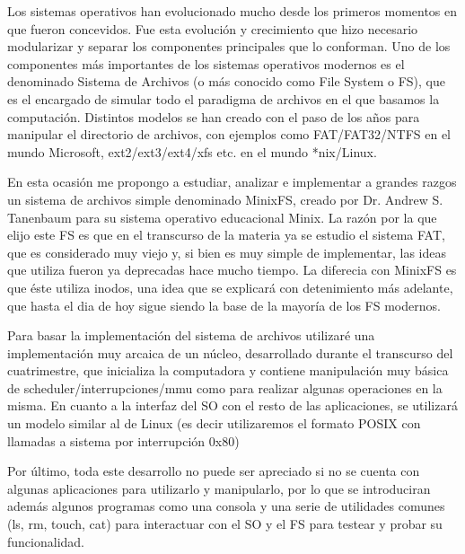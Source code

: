 Los sistemas operativos han evolucionado mucho desde los primeros momentos en
que fueron concevidos. Fue esta evolución y crecimiento que hizo necesario
modularizar y separar los componentes principales que lo conforman. Uno de los
componentes más importantes de los sistemas operativos modernos es el denominado
Sistema de Archivos (o más conocido como File System o FS), que es el encargado
de simular todo el paradigma de archivos en el que basamos la computación.
Distintos modelos se han creado con el paso de los años para manipular el
directorio de archivos, con ejemplos como FAT/FAT32/NTFS en el mundo Microsoft,
ext2/ext3/ext4/xfs etc. en el mundo *nix/Linux.

En esta ocasión me propongo a estudiar, analizar e implementar a grandes razgos
un sistema de archivos simple denominado MinixFS, creado por Dr. Andrew S.
Tanenbaum para su sistema operativo educacional Minix. La razón por la que elijo
este FS es que en el transcurso de la materia ya se estudio el sistema FAT, que
es considerado muy viejo y, si bien es muy simple de implementar, las ideas que
utiliza fueron ya deprecadas hace mucho tiempo. La diferecia con MinixFS es que
éste utiliza inodos, una idea que se explicará con detenimiento más adelante,
que hasta el dia de hoy sigue siendo la base de la mayoría de los FS modernos.

Para basar la implementación del sistema de archivos utilizaré una
implementación muy arcaica de un núcleo, desarrollado durante el transcurso del
cuatrimestre, que inicializa la computadora y contiene manipulación muy básica
de scheduler/interrupciones/mmu como para realizar algunas operaciones en la
misma. En cuanto a la interfaz del SO con el resto de las aplicaciones, se
utilizará un modelo similar al de Linux (es decir utilizaremos el formato POSIX
con llamadas a sistema por interrupción 0x80)

Por último, toda este desarrollo no puede ser apreciado si no se cuenta con
algunas aplicaciones para utilizarlo y manipularlo, por lo que se introduciran
además algunos programas como una consola y una serie de utilidades comunes (ls,
rm, touch, cat) para interactuar con el SO y el FS para testear y probar su
funcionalidad.
